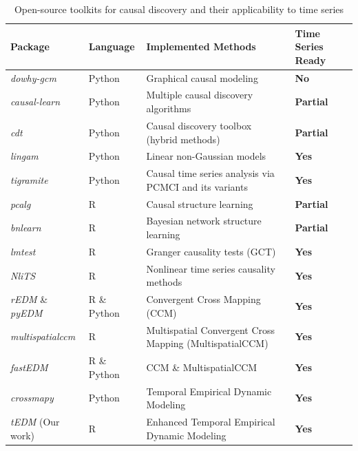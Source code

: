 \documentclass[authoryear,preprint,review,12pt]{elsarticle}
\begin{document}
\begin{table}[h!]
\centering
\caption{Open-source toolkits for causal discovery and their applicability to time series}
\label{tab_toolkits}
\renewcommand{\arraystretch}{1.3}
\begin{tabular}{| p{3.2cm} | p{2.8cm} | p{7.2cm} | p{2.5cm} |}
\hline
\textbf{Package} & \textbf{Language} & \textbf{Implemented Methods} & \textbf{Time Series Ready} \\
\hline
\textit{dowhy-gcm}       & Python           & Graphical causal modeling & \textbf{No} \\
\textit{causal-learn}    & Python           & Multiple causal discovery algorithms            & \textbf{Partial} \\
\textit{cdt}             & Python           & Causal discovery toolbox (hybrid methods)            & \textbf{Partial} \\
\textit{lingam}          & Python           & Linear non-Gaussian models      & \textbf{Yes} \\
\textit{tigramite}       & Python           & Causal time series analysis via PCMCI and its variants     & \textbf{Yes} \\
\textit{pcalg}           & R                & Causal structure learning                & \textbf{Partial} \\
\textit{bnlearn}         & R                & Bayesian network structure learning                  & \textbf{Partial} \\
\textit{lmtest}          & R                & Granger causality tests  (GCT)                             & \textbf{Yes} \\
\textit{NliTS}           & R                & Nonlinear time series causality methods              & \textbf{Yes} \\
\textit{rEDM} \& \textit{pyEDM}     & R \& Python                 & Convergent Cross Mapping (CCM)             & \textbf{Yes} \\
\textit{multispatialccm} & R                & Multispatial Convergent Cross Mapping (MultispatialCCM)                  & \textbf{Yes} \\
\textit{fastEDM}         & R \& Python      &   CCM \& MultispatialCCM                          & \textbf{Yes} \\
\textit{crossmapy}       & Python           & Temporal Empirical Dynamic Modeling      & \textbf{Yes} \\
\textit{tEDM} (Our work)       & R          & Enhanced Temporal Empirical Dynamic Modeling                           & \textbf{Yes} \\
\hline
\end{tabular}
\end{table}
\end{document}
